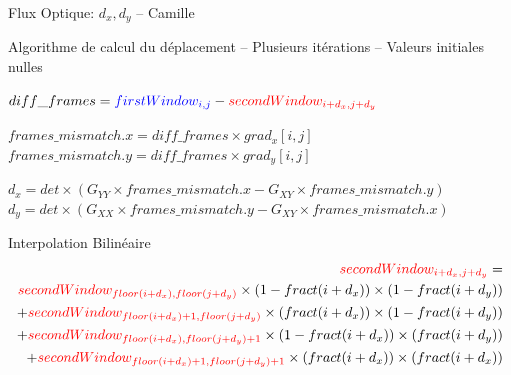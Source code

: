 \documentclass{bredelebeamer}
\begin{document}
\begin{frame}{Flux Optique: $d_{x}, d_{y}$ -- Camille}

	\begin{block}{Algorithme de calcul du déplacement -- Plusieurs itérations -- Valeurs initiales nulles}
\begin{algorithmic}

	\State $diff\_frames = \textcolor{blue}{firstWindow_{i,j}} - \textcolor{red}{secondWindow_{i+d_{x},j+d_{y}}}$

	\State $frames\_mismatch.x = diff\_frames\times grad_{x}[i,j]$
	\State $frames\_mismatch.y = diff\_frames\times grad_{y}[i,j]$

	\EndFor

	\State $d_{x} = det\times (G_{YY}\times frames\_mismatch.x - G_{XY}\times frames\_mismatch.y)$
	\State $d_{y} = det\times (G_{XX}\times frames\_mismatch.y - G_{XY}\times frames\_mismatch.x)$
\end{algorithmic}
\end{block}

	\begin{alertblock}{Interpolation Bilinéaire}
\begin{equation*}
	\begin{split}
		\textcolor{red}{secondWindow_{i+d_{x},j+d_{y}}} =\\
		\textcolor{red}{secondWindow_{floor(i+d_{x}),floor(j+d_{y})}}\times (1-fract(i+d_{x}))\times (1-fract(i+d_{y}))\\
		+ \textcolor{red}{secondWindow_{floor(i+d_{x})+1,floor(j+d_{y})}}\times (fract(i+d_{x}))\times (1-fract(i+d_{y}))\\
		+ \textcolor{red}{secondWindow_{floor(i+d_{x}),floor(j+d_{y})+1}}\times (1-fract(i+d_{x}))\times (fract(i+d_{y}))\\
		+ \textcolor{red}{secondWindow_{floor(i+d_{x})+1,floor(j+d_{y})+1}}\times (fract(i+d_{x}))\times (fract(i+d_{x}))
	\end{split}
\end{equation*}
	\end{alertblock}

\end{frame}

\end{document}

